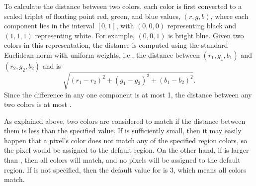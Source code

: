 \begin{description}
To calculate the distance between two colors, each color is first
converted to a scaled triplet of floating point red, green, and blue
values, $(r,g,b)$, where each component lies in the interval $[0,1]$,
with $(0,0,0)$ representing black and $(1,1,1)$ representing white.  For
example, $(0,0,1)$ is bright blue.  Given two colors in this
representation, the distance is computed using the standard Euclidean
norm with uniform weights, i.e., the distance between $(r_1,g_1,b_1)$
and $(r_2,g_2,b_2)$ and is
\begin{displaymath}
\sqrt{(r_1-r_2)^2 + (g_1-g_2)^2 + (b_1-b_2)^2}.
\end{displaymath}
Since the difference in any one component is at most 1, the distance
between any two colors is at most .

As explained above, two colors are considered to match if the distance
between them is less than the specified  value.  If
 is sufficiently small, then it may easily
happen that a pixel's color does not match any of the specified region
colors, so the pixel would be assigned to the default region.  On the
other hand, if  is larger than
, then all colors will match, and no pixels will be
assigned to the default region.  If  is not specified,
then the default value for  is 3, which
means all colors match.


\end{description}

